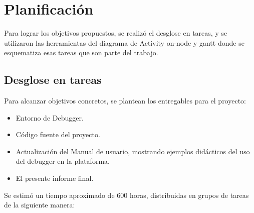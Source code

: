 \section{Planificación}
\label{sec:ejemplo}

Para lograr los objetivos propuestos, se realizó el desglose en tareas, y se utilizaron las herramientas del diagrama de Activity on-node y gantt donde se esquematiza esas tareas que son parte del trabajo.

\subsection{Desglose en tareas} 

Para alcanzar objetivos concretos, se plantean los entregables para el proyecto:

\begin{itemize}
	\item Entorno de Debugger.	
	\item Código fuente del proyecto.
	\item Actualización del Manual de usuario, mostrando ejemplos didácticos del uso del debugger en la plataforma.
	\item El presente informe final.
\end{itemize}

Se estimó un tiempo aproximado de 600 horas, distribuidas en grupos de tareas de
la siguiente manera:

